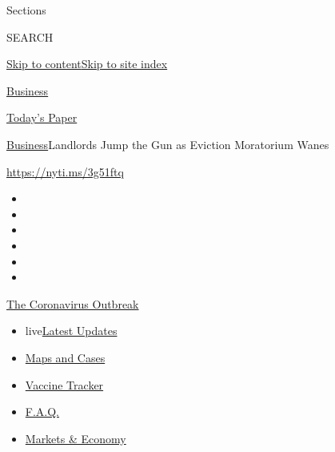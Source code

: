 Sections

SEARCH

\protect\hyperlink{site-content}{Skip to
content}\protect\hyperlink{site-index}{Skip to site index}

\href{https://www.nytimes.com/section/business}{Business}

\href{https://myaccount.nytimes.com/auth/login?response_type=cookie\&client_id=vi}{}

\href{https://www.nytimes.com/section/todayspaper}{Today's Paper}

\href{/section/business}{Business}\textbar{}Landlords Jump the Gun as
Eviction Moratorium Wanes

\href{https://nyti.ms/3g51ftq}{https://nyti.ms/3g51ftq}

\begin{itemize}
\item
\item
\item
\item
\item
\item
\end{itemize}

\href{https://www.nytimes.com/news-event/coronavirus?action=click\&pgtype=Article\&state=default\&region=TOP_BANNER\&context=storylines_menu}{The
Coronavirus Outbreak}

\begin{itemize}
\tightlist
\item
  live\href{https://www.nytimes.com/2020/08/08/world/coronavirus-updates.html?action=click\&pgtype=Article\&state=default\&region=TOP_BANNER\&context=storylines_menu}{Latest
  Updates}
\item
  \href{https://www.nytimes.com/interactive/2020/us/coronavirus-us-cases.html?action=click\&pgtype=Article\&state=default\&region=TOP_BANNER\&context=storylines_menu}{Maps
  and Cases}
\item
  \href{https://www.nytimes.com/interactive/2020/science/coronavirus-vaccine-tracker.html?action=click\&pgtype=Article\&state=default\&region=TOP_BANNER\&context=storylines_menu}{Vaccine
  Tracker}
\item
  \href{https://www.nytimes.com/interactive/2020/world/coronavirus-tips-advice.html?action=click\&pgtype=Article\&state=default\&region=TOP_BANNER\&context=storylines_menu}{F.A.Q.}
\item
  \href{https://www.nytimes.com/live/2020/08/07/business/stock-market-today-coronavirus?action=click\&pgtype=Article\&state=default\&region=TOP_BANNER\&context=storylines_menu}{Markets
  \& Economy}
\end{itemize}

